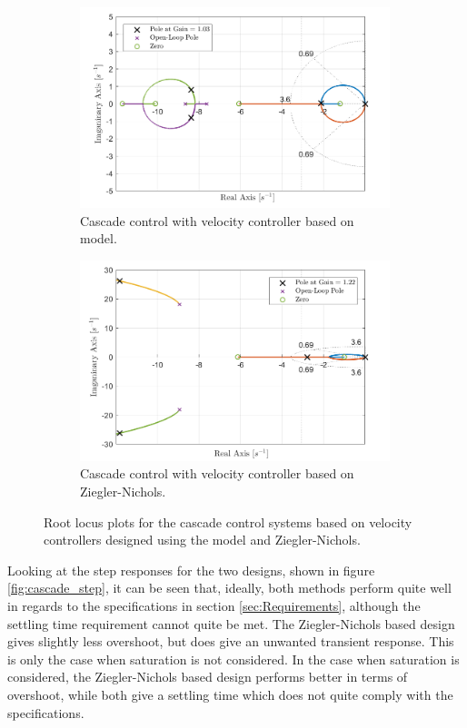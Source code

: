 \documentclass[../../main.tex]{subfiles}
\begin{document}
\begin{figure}[h]
\begin{subfigure}{0.49\textwidth}
    \includegraphics[width = 0.99\textwidth]{Sections/System_Design/Images/RL_cascadePP.pdf}
    \caption{Cascade control with velocity controller based on model.}
    \label{fig:RL_cascade_PP}
\end{subfigure}\hfill
\begin{subfigure}{0.49\textwidth}
    \includegraphics[width = 0.99\textwidth]{Sections/System_Design/Images/RL_cascadeNZ.pdf}
    \caption{Cascade control with velocity controller based on Ziegler-Nichols.}
    \label{fig:RL_cascade_NZ}
\end{subfigure}
\caption{Root locus plots for the cascade control systems based on velocity controllers designed using the model and Ziegler-Nichols.}
\label{fig:RL_cascade}
\end{figure}

Looking at the step responses for the two designs, shown in figure \ref{fig:cascade_step}, it can be seen that, ideally, both methods perform quite well in regards to the specifications in section \ref{sec:Requirements}, although the settling time requirement cannot quite be met. The Ziegler-Nichols based design gives slightly less overshoot, but does give an unwanted transient response. This is only the case when saturation is not considered. In the case when saturation is considered, the Ziegler-Nichols based design performs better in terms of overshoot, while both give a settling time which does not quite comply with the specifications.
\end{document}
